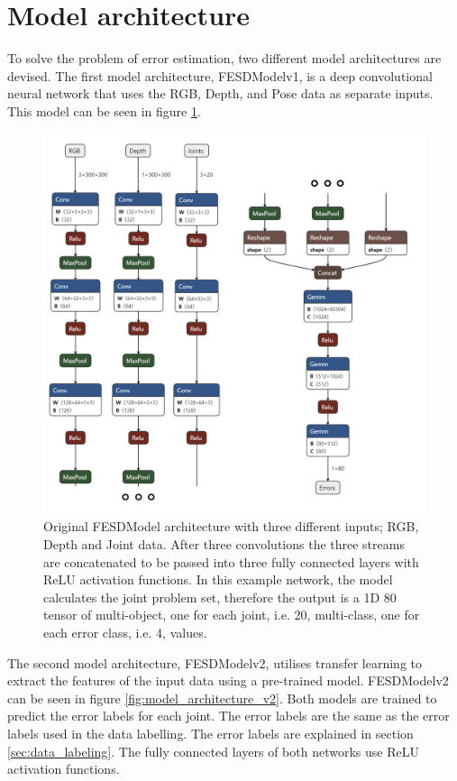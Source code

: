 \section{Model architecture}
\label{sec:model_architecture}

To solve the problem of error estimation, two different model architectures are devised. The first model architecture, FESDModelv1, is a deep convolutional neural network that uses the RGB, Depth, and Pose data as separate inputs. This model can be seen in figure \ref{fig:model_architecture_v1}.

\begin{figure}[ht]
  \centering
  \includegraphics[width=.8\linewidth]{figures/Model/FESD.png}
  \caption[FESDModel architecture version 1]{Original FESDModel architecture with three different inputs; RGB, Depth and Joint data. After three convolutions the three streams are concatenated to be passed into three fully connected layers with ReLU activation functions. In this example network, the model calculates the joint problem set, therefore the output is a 1D 80 tensor of multi-object, one for each joint, i.e. 20, multi-class, one for each error class, i.e. 4, values.}
  \label{fig:model_architecture_v1}
\end{figure}

The second model architecture, FESDModelv2, utilises transfer learning to extract the features of the input data using a pre-trained model. FESDModelv2 can be seen in figure \ref{fig:model_architecture_v2}. Both models are trained to predict the error labels for each joint. The error labels are the same as the error labels used in the data labelling. The error labels are explained in section \ref{sec:data_labeling}. The fully connected layers of both networks use ReLU activation functions.


